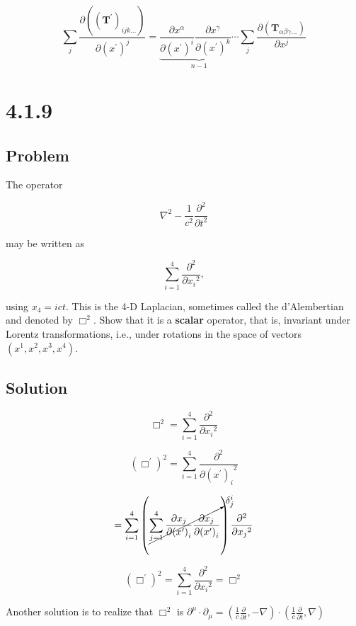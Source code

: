 \documentclass[12pt]{article}
\begin{document}
\[
    \sum_j
    \frac
    {\partial \left({\left(\textbf{T}^\prime\right)}_{ijk \ldots}\right)}
    {\partial {\left(x^\prime\right)}^j}
    = \underbrace{\frac{\partial x^\alpha}{\partial {\left(x^\prime\right)}^i}
    \frac{\partial x^\gamma}{\partial {\left(x^\prime\right)}^k}
    \cdots}_{n - 1}
    \sum_j
    \frac
    {\partial \left(\textbf{T}_{\alpha \beta \gamma \ldots}\right)}
    {\partial x^j}
\]

\newpage
\section{4.1.9}

\subsection{Problem}

The operator

\[
    \nabla^2 - \frac{1}{c^2} \frac{\partial^2}{\partial t^2}
\]

may be written as

\[
    \sum^4_{i = 1} \frac{\partial^2}{\partial {x_i}^2},
\]

using \(x_4 = ict\). This is the 4-D Laplacian, sometimes called the d'Alember\-tian and denoted
by \(\Box^2\). Show that it is a \textbf{scalar} operator, that is, invariant under Lorentz
transformations, i.e., under rotations in the space of vectors \((x^1, x^2, x^3, x^4)\).

\subsection{Solution}

\[
    \Box^2 = \sum^4_{i = 1} \frac{\partial^2}{\partial {x_i}^2}
\]

\[
    \left(\Box^\prime\right)^2
    = \sum^4_{i = 1} \frac{\partial^2}{\partial {{\left(x^\prime\right)}_i}^2}
\]

\[
    = \sum^4_{i = 1}
    \left(\cancelto{\delta^i_j}{\sum^4_{j = 1} \frac{\partial {x_j}}{\partial {{\left(x^\prime\right)}_i}}
        \frac{\partial {x_j}}{\partial {{\left(x^\prime\right)}_i}}}\right)
    \frac{\partial^2}{\partial {x_j}^2}
\]

\[
    \left(\Box^\prime\right)^2
    = \sum^4_{i = 1} \frac{\partial^2}{\partial {x_i}^2}
    = \Box^2
\]

Another solution is to realize that \(\Box^2\) is \(\partial^\mu \cdot \partial_\mu = \left(\frac{1}{c} \frac{\partial}{\partial t},-\nabla\right) \cdot \left(\frac{1}{c} \frac{\partial}{\partial t}, \nabla\right)\)

\newpage


\nocite{arfken2013mathematical}
\nocite{El-Deeb_PEU-356_Assignments}
\end{document}
